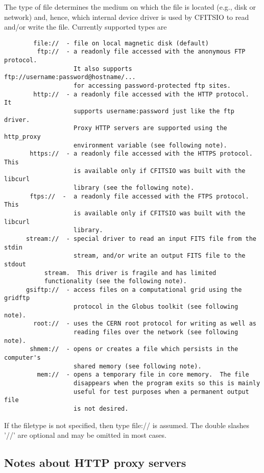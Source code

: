 \documentclass[11pt]{book}
\begin{document}
The type of file determines the medium on which the file is located
(e.g., disk or network) and, hence, which internal device driver is used by
CFITSIO to read and/or write the file.  Currently supported types are

\begin{verbatim}
        file://  - file on local magnetic disk (default)
         ftp://  - a readonly file accessed with the anonymous FTP protocol.
                   It also supports  ftp://username:password@hostname/...
                   for accessing password-protected ftp sites.
        http://  - a readonly file accessed with the HTTP protocol.  It
                   supports username:password just like the ftp driver.
                   Proxy HTTP servers are supported using the http_proxy
                   environment variable (see following note).
       https://  - a readonly file accessed with the HTTPS protocol.  This
                   is available only if CFITSIO was built with the libcurl
                   library (see the following note).
       ftps://  -  a readonly file accessed with the FTPS protocol.  This
                   is available only if CFITSIO was built with the libcurl
                   library.
      stream://  - special driver to read an input FITS file from the stdin
                   stream, and/or write an output FITS file to the stdout
		   stream.  This driver is fragile and has limited
		   functionality (see the following note).
      gsiftp://  - access files on a computational grid using the gridftp
                   protocol in the Globus toolkit (see following note).
        root://  - uses the CERN root protocol for writing as well as
                   reading files over the network (see following note).
       shmem://  - opens or creates a file which persists in the computer's
                   shared memory (see following note).
         mem://  - opens a temporary file in core memory.  The file
                   disappears when the program exits so this is mainly
                   useful for test purposes when a permanent output file
                   is not desired.
\end{verbatim}
If the filetype is not specified, then type file:// is assumed.
The double slashes '//' are optional and may be omitted in most cases.


\subsection{Notes about HTTP proxy servers}
\end{document}
